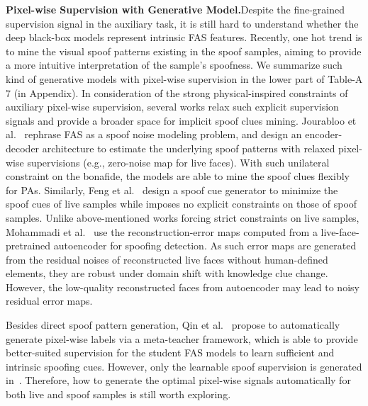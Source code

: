 \documentclass[10pt,journal,compsoc]{IEEEtran}
\begin{document}
\vspace{0.4em}
\noindent\textbf{Pixel-wise Supervision with Generative Model.}\quad   Despite the fine-grained supervision signal in the auxiliary task, it is still hard to understand whether the deep black-box models represent intrinsic FAS features. Recently, one hot trend is to mine the visual spoof patterns existing in the spoof samples, aiming to provide a more intuitive interpretation of the sample’s spoofness. We summarize such kind of generative models with pixel-wise supervision in the lower part of Table-A 7 (in Appendix). In consideration of the strong physical-inspired constraints of auxiliary pixel-wise supervision, several works relax such explicit supervision signals and provide a broader space for implicit spoof clues mining. Jourabloo et al.~\cite{jourabloo2018face} rephrase FAS as a spoof noise modeling problem, and design an encoder-decoder architecture to estimate the underlying spoof patterns with relaxed pixel-wise supervisions (e.g., zero-noise map for live faces). With such unilateral constraint on the bonafide, the models are able to mine the spoof clues flexibly for PAs. Similarly, Feng et al.~\cite{feng2020learning} design a spoof cue generator to minimize the spoof cues of live samples while imposes no explicit constraints on those of spoof samples. Unlike above-mentioned works forcing strict constraints on live samples, Mohammadi et al.~\cite{mohammadi2020improving} use the reconstruction-error maps computed from a live-face-pretrained autoencoder for spoofing detection. As such error maps are generated from the residual noises of reconstructed live faces without human-defined elements, they are robust under domain shift with knowledge clue change. However, the low-quality reconstructed faces from autoencoder may lead to noisy residual error maps.

Besides direct spoof pattern generation, Qin et al.~\cite{qin2021meta} propose to automatically generate pixel-wise labels via a meta-teacher framework, which is able to provide better-suited supervision for the student FAS models to learn sufficient and intrinsic spoofing cues. However, only the learnable spoof supervision is generated in~\cite{qin2021meta}. Therefore, how to generate the optimal pixel-wise signals automatically for both live and spoof samples is still worth exploring.


\end{document}
